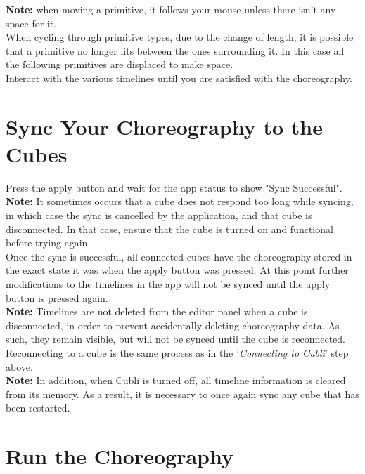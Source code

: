 \textbf{Note:} when moving a primitive, it follows your mouse unless there isn't any space for it.\\

When cycling through primitive types, due to the change of length, it is possible that a primitive no longer fits between the ones surrounding it. In this case all the following primitives are displaced to make space.\\

Interact with the various timelines until you are satisfied with the choreography.


\section{Sync Your Choreography to the Cubes}

Press the apply button and wait for the app status to show "Sync Successful".\\

\textbf{Note:} It sometimes occurs that a cube does not respond too long while syncing, in which case the sync is cancelled by the application, and that cube is disconnected. In that case, ensure that the cube is turned on and functional before trying again.\\

Once the sync is successful, all connected cubes have the choreography stored in the exact state it was when the apply button was pressed. 
At this point further modifications to the timelines in the app will not be synced until the apply button is pressed again.\\

\textbf{Note:} Timelines are not deleted from the editor panel when a cube is disconnected, in order to prevent accidentally deleting choreography data. As such, they remain visible, but will not be synced until the cube is reconnected. Reconnecting to a cube is the same process as in the '\textit{Connecting to Cubli}' step above.\\

\textbf{Note:} In addition, when Cubli is turned off, all timeline information is cleared from its memory. As a result, it is necessary to once again sync any cube that has been restarted.




\section{Run the Choreography}

